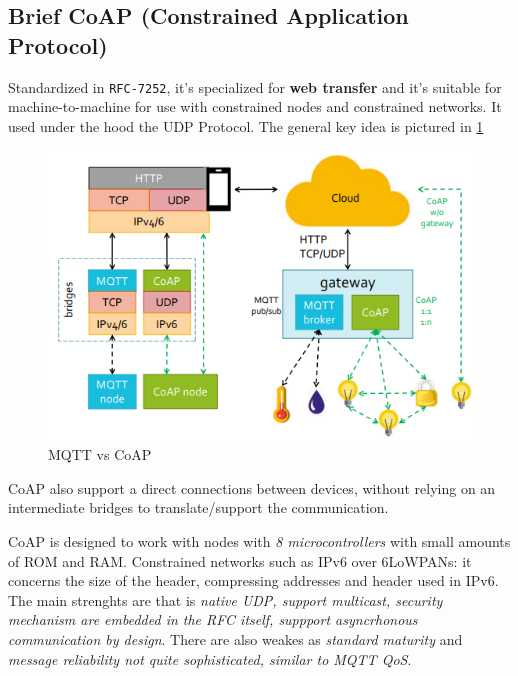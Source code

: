 \documentclass[10pt,a4paper]{report}
\theoremstyle{definition}
\begin{document}
\subsection{Brief CoAP (Constrained Application Protocol)}\label{sec:brief-coap-constrained-application-protocol}
Standardized in \texttt{RFC-7252}, it's specialized for \textbf{web transfer} and it's suitable for machine-to-machine for use with constrained nodes and constrained networks. It used under the hood the UDP Protocol. The general key idea is pictured in \ref{mqtt-vs-coap}
\begin{figure}[h]
	\centering\includegraphics[scale=0.50]{images/Pasted image 20230307113500.png}
	\caption{MQTT vs CoAP}\label{mqtt-vs-coap}\end{figure}


CoAP also support a direct connections between devices, without relying on an intermediate bridges to translate/support the communication.

CoAP is designed to work with nodes with \textit{8 microcontrollers} with small amounts of ROM and RAM.  Constrained networks such as IPv6 over 6LoWPANs: it concerns the size of the header, compressing addresses and header used in IPv6.\\
The main strenghts are that is \textit{native UDP, support multicast, security mechanism are embedded in the RFC itself, suppport asyncrhonous communication by design}. There are also weakes as \textit{standard maturity} and \textit{message reliability not quite sophisticated, similar to MQTT QoS}.
\end{document}
